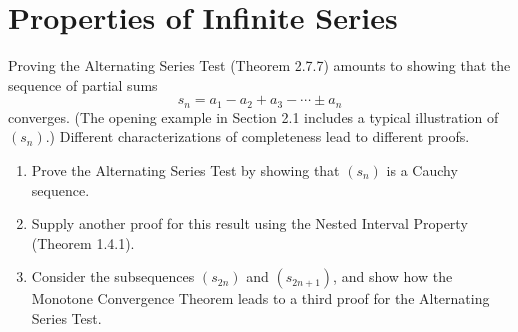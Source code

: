 \documentclass{lew98_solutions}
\begin{document}
\section{Properties of Infinite Series}
\label{sec:2.7}

\begin{exercise}
\label{ex:2.7.1}
    Proving the Alternating Series Test (Theorem 2.7.7) amounts to showing that the sequence of partial sums
    \[
        s_n = a_1 - a_2 + a_3 - \cdots \pm a_n
    \]
    converges. (The opening example in Section 2.1 includes a typical illustration of \( (s_n) \).) Different characterizations of completeness lead to different proofs.
    \begin{enumerate}
        \item Prove the Alternating Series Test by showing that \( (s_n) \) is a Cauchy sequence.

        \item Supply another proof for this result using the Nested Interval Property (Theorem 1.4.1).

        \item Consider the subsequences \( (s_{2n}) \) and \( (s_{2n+1}) \), and show how the Monotone Convergence Theorem leads to a third proof for the Alternating Series Test.
    \end{enumerate}
\end{exercise}
\end{document}
